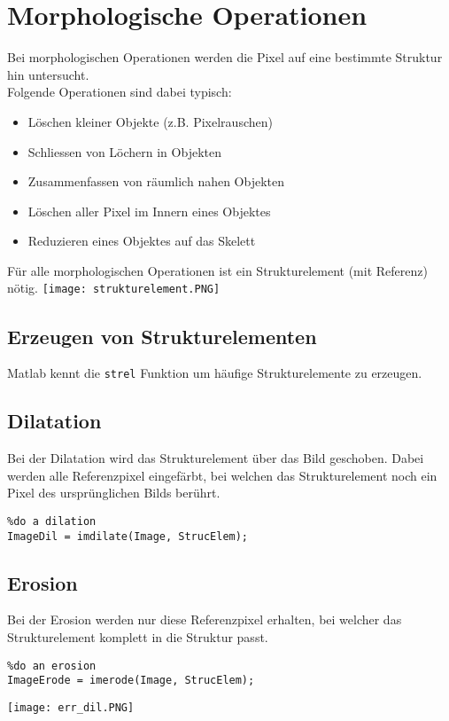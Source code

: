 \section{Morphologische Operationen}
Bei morphologischen Operationen werden die Pixel auf eine bestimmte Struktur hin untersucht.\\
Folgende Operationen sind dabei typisch:
\begin{itemize}
    \item Löschen kleiner Objekte (z.B. Pixelrauschen)
    \item Schliessen von Löchern in Objekten
    \item Zusammenfassen von räumlich nahen Objekten
    \item Löschen aller Pixel im Innern eines Objektes
    \item Reduzieren eines Objektes auf das Skelett
\end{itemize}
Für alle morphologischen Operationen ist ein Strukturelement (mit Referenz) nötig.
\texttt{[image: strukturelement.PNG]}
\subsection{Erzeugen von Strukturelementen}
Matlab kennt die \lstinline{strel} Funktion um häufige Strukturelemente zu erzeugen.

\subsection{Dilatation}
Bei der Dilatation wird das Strukturelement über das Bild geschoben. Dabei werden alle Referenzpixel eingefärbt, bei welchen das Strukturelement noch ein Pixel des ursprünglichen Bilds berührt.
\begin{lstlisting}
%do a dilation 
ImageDil = imdilate(Image, StrucElem);
\end{lstlisting}

\subsection{Erosion}
Bei der Erosion werden nur diese Referenzpixel erhalten, bei welcher das Strukturelement komplett in die Struktur passt.
\begin{lstlisting}
%do an erosion 
ImageErode = imerode(Image, StrucElem);
\end{lstlisting}

\texttt{[image: err\_dil.PNG]}

